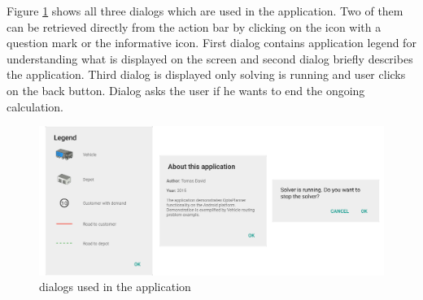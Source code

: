 Figure \ref{dialogs} shows all three dialogs which are used in the application. Two of them can be retrieved directly from the
action bar by clicking on the icon with a question mark or the informative icon. First dialog contains application
legend for understanding what is displayed on the screen and second dialog briefly describes the application. Third
dialog is displayed only solving is running and user clicks on the back button. Dialog asks the user if he wants to end
the ongoing calculation.

\begin{figure}[h!]
    \centering
    \includegraphics[scale=0.15]{fig/dialogs.png}
    \caption{dialogs used in the application}
    \label{dialogs}
\end{figure}
